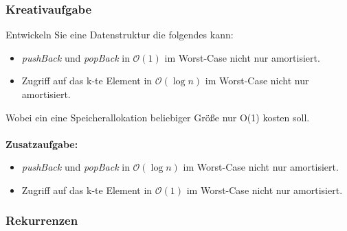 \begin{frame}
	\frametitle{Kreativaufgabe}
	Entwickeln Sie eine Datenstruktur die folgendes kann:
	\begin{itemize}
		\item \textit{pushBack} und \textit{popBack} in  $\mathcal{O}(1)$ im Worst-Case nicht nur amortisiert.
		\item Zugriff auf das k-te Element in $\mathcal{O}(\log n)$ im Worst-Case nicht nur amortisiert.
	\end{itemize}
	Wobei ein eine Speicherallokation beliebiger Größe nur O(1) kosten soll.\\
	\ \\
	\textbf{Zusatzaufgabe:}\\
	\begin{itemize}
		\item \textit{pushBack} und \textit{popBack} in  $\mathcal{O}(\log n)$ im Worst-Case nicht nur amortisiert.
		\item Zugriff auf das k-te Element in $\mathcal{O}(1)$ im Worst-Case nicht nur amortisiert.
	\end{itemize}

\end{frame}


\begin{frame}
	\frametitle{Rekurrenzen}

\end{frame}



